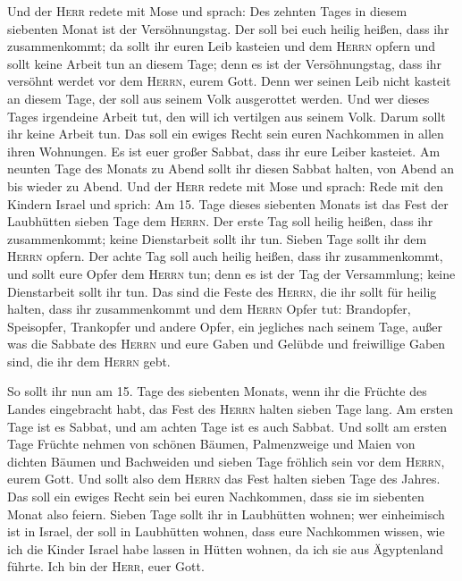  Und der \textsc{Herr} redete mit Mose und sprach:
 Des zehnten Tages in diesem siebenten Monat ist der
Versöhnungstag. Der soll bei euch heilig heißen, dass ihr zusammenkommt;
da sollt ihr euren Leib kasteien und dem \textsc{Herrn} opfern
 und sollt keine Arbeit tun an diesem Tage; denn es ist
der Versöhnungstag, dass ihr versöhnt werdet vor dem \textsc{Herrn},
eurem Gott.  Denn wer seinen Leib nicht kasteit an diesem
Tage, der soll aus seinem Volk ausgerottet werden.  Und
wer dieses Tages irgendeine Arbeit tut, den will ich vertilgen aus
seinem Volk.  Darum sollt ihr keine Arbeit tun. Das soll
ein ewiges Recht sein euren Nachkommen in allen ihren Wohnungen.
 Es ist euer großer Sabbat, dass ihr eure Leiber
kasteiet. Am neunten Tage des Monats zu Abend sollt ihr diesen Sabbat
halten, von Abend an bis wieder zu Abend.  Und der
\textsc{Herr} redete mit Mose und sprach:  Rede mit den
Kindern Israel und sprich: Am 15. Tage dieses siebenten Monats ist das
Fest der Laubhütten sieben Tage dem \textsc{Herrn}.  Der
erste Tag soll heilig heißen, dass ihr zusammenkommt; keine Dienstarbeit
sollt ihr tun.  Sieben Tage sollt ihr dem \textsc{Herrn}
opfern. Der achte Tag soll auch heilig heißen, dass ihr zusammenkommt,
und sollt eure Opfer dem \textsc{Herrn} tun; denn es ist der Tag der
Versammlung; keine Dienstarbeit sollt ihr tun.  Das sind
die Feste des \textsc{Herrn}, die ihr sollt für heilig halten, dass ihr
zusammenkommt und dem \textsc{Herrn} Opfer tut: Brandopfer, Speisopfer,
Trankopfer und andere Opfer, ein jegliches nach seinem Tage,
 außer was die Sabbate des \textsc{Herrn} und eure Gaben
und Gelübde und freiwillige Gaben sind, die ihr dem \textsc{Herrn} gebt.

 So sollt ihr nun am 15. Tage des siebenten Monats, wenn
ihr die Früchte des Landes eingebracht habt, das Fest des \textsc{Herrn}
halten sieben Tage lang. Am ersten Tage ist es Sabbat, und am achten
Tage ist es auch Sabbat.  Und sollt am ersten Tage
Früchte nehmen von schönen Bäumen, Palmenzweige und Maien von dichten
Bäumen und Bachweiden und sieben Tage fröhlich sein vor dem
\textsc{Herrn}, eurem Gott.  Und sollt also dem
\textsc{Herrn} das Fest halten sieben Tage des Jahres. Das soll ein
ewiges Recht sein bei euren Nachkommen, dass sie im siebenten Monat also
feiern.  Sieben Tage sollt ihr in Laubhütten wohnen; wer
einheimisch ist in Israel, der soll in Laubhütten wohnen,
 dass eure Nachkommen wissen, wie ich die Kinder Israel
habe lassen in Hütten wohnen, da ich sie aus Ägyptenland führte. Ich bin
der \textsc{Herr}, euer Gott.

